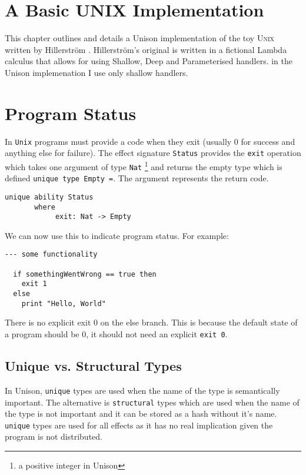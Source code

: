 \documentclass[logo,bsc,singlespacing,parskip]{infthesis}
\begin{document}
\section{A Basic UNIX Implementation}

This chapter outlines and details a Unison implementation of the toy
\textsc{Unix} written by Hillerstr\"{o}m \cite{hillerstrom2022foundations}.
Hillerstr\"{o}m's original is written in a fictional Lambda calculus that allows
for using Shallow, Deep and Parameterised handlers. in the Unison implemenation
I use only shallow handlers.

\section{Program Status}
\label{status}

In \texttt{Unix} programs must provide a code when they exit (usually 0 for
success and anything else for failure). The effect signature \texttt{Status}
provides the \texttt{exit} operation which takes one argument of type
\texttt{Nat} \footnote{a positive integer in Unison} and returns the empty type
which is defined \texttt{unique type Empty =}. The argument represents the
return code.

\begin{lstlisting}[language=unison]
unique ability Status
       where
            exit: Nat -> Empty
\end{lstlisting}

We can now use this to indicate program status. For example:

\begin{lstlisting}[language=unison]
  --- some functionality 

  if somethingWentWrong == true then
    exit 1
  else
    print "Hello, World"
\end{lstlisting}

There is no explicit exit 0 on the else branch. This is because the default
state of a program should be 0, it should not need an explicit \texttt{exit 0}.

\subsection{Unique vs. Structural Types}

In Unison, \texttt{unique} types are used when the name of the type is
semantically important. The alternative is \texttt{structural} types which are
used when the name of the type is not important and it can be stored as a hash
without it's name. \texttt{unique} types are used for all effects as it has no
real implication given the program is not distributed.
\end{document}
